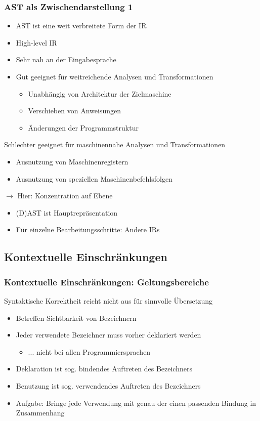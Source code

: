 \subsubsection*{AST als Zwischendarstellung 1}
\begin{itemize}
	\item AST ist eine weit verbreitete Form der IR
	\item High-level IR
	\item Sehr nah an der Eingabesprache
	\item Gut geeignet für weitreichende Analysen und Transformationen
	\begin{itemize}
		\item Unabhängig von Architektur der Zielmaschine
		\item Verschieben von Anweisungen 
		\item Änderungen der Programmstruktur
	\end{itemize}
\end{itemize}
Schlechter geeignet für maschinennahe Analysen und Transformationen
\begin{itemize}
	\item Ausnutzung von Maschinenregistern
	\item Ausnutzung von speziellen Maschinenbefehlsfolgen
\end{itemize}
$\rightarrow$ Hier: Konzentration auf  Ebene
\begin{itemize}
	\item (D)AST ist Hauptrepräsentation
	\item Für einzelne Bearbeitungsschritte: Andere IRs
\end{itemize}

\subsection{Kontextuelle Einschränkungen}
\subsubsection*{Kontextuelle Einschränkungen: Geltungsbereiche}
Syntaktische Korrektheit reicht nicht aus für sinnvolle Übersetzung
\begin{defBox}[title=Geltungsbereiche(Scope)]
	\begin{itemize}
		\item Betreffen Sichtbarkeit von Bezeichnern
		\item Jeder verwendete Bezeichner muss vorher deklariert werden
		\begin{itemize}
			\item ... nicht bei allen Programmiersprachen
		\end{itemize}
		\item Deklaration ist sog. bindendes Auftreten des Bezeichners
		\item Benutzung ist sog. verwendendes Auftreten des Bezeichners
		\item Aufgabe: Bringe jede Verwendung mit genau der einen passenden Bindung in Zusammenhang
	\end{itemize}
\end{defBox}
